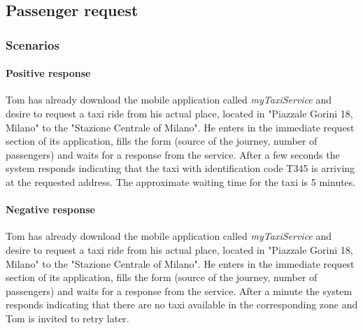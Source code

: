 \subsection{Passenger request}
\subsubsection{Scenarios}
\paragraph{Positive response}
Tom has already download the mobile application called \textit{myTaxiService} and desire to request a taxi ride from his actual place, located in "Piazzale Gorini 18, Milano" to the "Stazione Centrale of Milano". He enters in the immediate request section of its application, fills the form (source of the journey, number of passengers) and waits for a response from the service.
After a few seconds the system responds indicating that the taxi with identification code T345 is arriving at the requested address. The approximate waiting time for the taxi is 5 minutes.

\paragraph{Negative response}
Tom has already download the mobile application called \textit{myTaxiService} and desire to request a taxi ride from his actual place, located in "Piazzale Gorini 18, Milano" to the "Stazione Centrale of Milano". He enters in the immediate request section of its application, fills the form (source of the journey, number of passengers) and waits for a response from the service.
After a minute the system responds indicating that there are no taxi available in the corresponding zone and Tom is invited to retry later.

